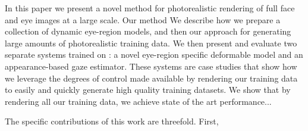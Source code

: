 


In this paper we present a novel method for photorealistic rendering of full face and eye images at a large scale.
Our method 
We describe how we prepare a collection of dynamic eye-region models, and then our approach for generating large amounts of photorealistic training data.
We then present and evaluate two separate systems trained on \dataset: a novel eye-region specific deformable model and an appearance-based gaze estimator.
These systems are case studies that show how we leverage the degrees of control made available by rendering our training data to easily and quickly generate high quality training datasets.
We show that by rendering all our training data, we achieve state of the art performance...

The specific contributions of this work are threefold. First, 

